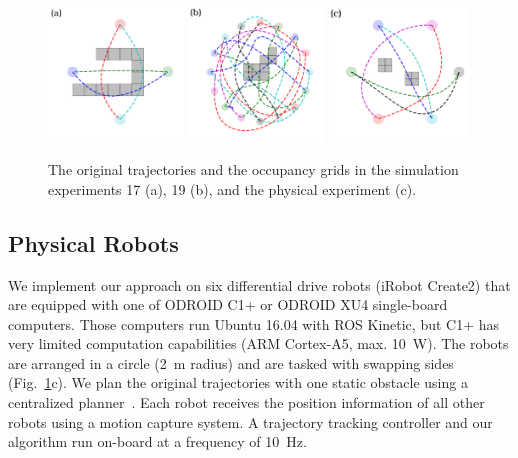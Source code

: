 \documentclass{svproc}
\begin{document}
\begin{figure}
\centering
\includegraphics[width=0.32\textwidth]{images/ex_17.pdf}
\hfill
\includegraphics[width=0.32\textwidth]{images/ex_19.pdf}
\hfill
\includegraphics[width=0.33\textwidth]{images/physical.pdf}
\caption{
The original trajectories and the occupancy grids in the simulation experiments 17 (a), 19 (b), and the physical experiment (c).
}
\label{fig:examples}
\end{figure}

\subsection{Physical Robots}
We implement our approach on six differential drive robots (iRobot Create2) that are equipped with one of ODROID C1+ or ODROID XU4 single-board computers.
Those computers run Ubuntu 16.04 with ROS Kinetic, but C1+ has very limited computation capabilities (ARM Cortex-A5, max. \SI{10}{W}).
The robots are arranged in a circle (\SI{2}{m} radius) and are tasked with swapping sides (Fig.~\ref{fig:examples}c).
We plan the original trajectories with one static obstacle using a centralized planner~\cite{crazyplanning-heterogeneous}.
Each robot receives the position information of all other robots using a motion capture system.
A trajectory tracking controller and our algorithm run on-board at a frequency of \SI{10}{Hz}.
\end{document}

